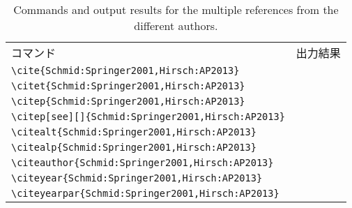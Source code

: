 \clearpage
\begin{table}[t]
    \centering
    \caption{Commands and output results for the multiple references from the different authors.}
    \label{tab:different_authors}
    \begin{tabular}{ll}
        コマンド &出力結果 \\
        \verb|\cite{Schmid:Springer2001,Hirsch:AP2013}|            &\cite{Schmid:Springer2001,Hirsch:AP2013} \\
        \verb|\citet{Schmid:Springer2001,Hirsch:AP2013}|           &\citet{Schmid:Springer2001,Hirsch:AP2013} \\
        \verb|\citep{Schmid:Springer2001,Hirsch:AP2013}|           &\citep{Schmid:Springer2001,Hirsch:AP2013} \\
        \verb|\citep[see][]{Schmid:Springer2001,Hirsch:AP2013}|           &\citep[see][]{Schmid:Springer2001,Hirsch:AP2013} \\
        \verb|\citealt{Schmid:Springer2001,Hirsch:AP2013}|         &\citealt{Schmid:Springer2001,Hirsch:AP2013} \\
        \verb|\citealp{Schmid:Springer2001,Hirsch:AP2013}|         &\citealp{Schmid:Springer2001,Hirsch:AP2013} \\
        \verb|\citeauthor{Schmid:Springer2001,Hirsch:AP2013}|      &\citeauthor{Schmid:Springer2001,Hirsch:AP2013} \\
        \verb|\citeyear{Schmid:Springer2001,Hirsch:AP2013}|        &\citeyear{Schmid:Springer2001,Hirsch:AP2013} \\
        \verb|\citeyearpar{Schmid:Springer2001,Hirsch:AP2013}|     &\citeyearpar{Schmid:Springer2001,Hirsch:AP2013}
    \end{tabular}
\end{table}

